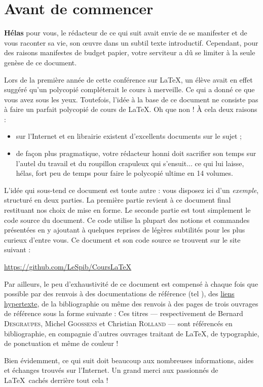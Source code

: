 
\chapter{Avant de commencer}
\mtcaddchapter

{\bf \LARGE Hélas} pour vous, le rédacteur de ce qui suit avait envie de se manifester et de vous raconter \og sa vie, son \oe uvre \fg{} dans un subtil texte introductif. Cependant, pour des raisons manifestes de budget papier, votre serviteur a dû se limiter à la seule genèse de ce document. 

Lors de la première année de cette \og conférence \fg{} sur \LaTeX, un élève avait en effet suggéré qu'un polycopié compléterait le cours à merveille. Ce qui a donné ce que vous avez sous les yeux. Toutefois, l'idée à la base de ce document ne consiste pas à faire un parfait polycopié de cours de \LaTeX. Oh que non ! \`{A} cela deux raisons :

\begin{itemize}
\item sur l'Internet et en librairie existent d'excellents documents sur le sujet ; 
\item de façon plus pragmatique, votre rédacteur honni doit sacrifier son temps sur l'autel du travail et du roupillon crapuleux qui s'ensuit... ce qui lui laisse, hélas, fort peu de temps pour faire le polycopié ultime en 14 volumes. \\
\end{itemize}

L'idée qui sous-tend ce document est toute autre : vous disposez ici d'un \emph{exemple}, structuré en deux parties. La première partie revient à ce document final restituant nos choix de mise en forme. Le seconde partie est tout simplement le code source du document. Ce code utilise la plupart des notions et commandes présentées en y ajoutant à quelques reprises de légères subtilités pour les plus curieux d'entre vous. Ce document et son code source se trouvent sur le site suivant :

\begin{center}
\href{https://github.com/LeSpib/CoursLaTeX}{https://github.com/LeSpib/CoursLaTeX}
\end{center}

Par ailleurs, le peu d'exhaustivité de ce document est compensé à chaque fois que possible par des renvois à des documentations de référence (tel ), des \href{http://fr.wikipedia.org/wiki/Hyperlien}{liens hypertexte}, de la bibliographie ou même des renvois à des pages de trois ouvrages de référence sous la forme suivante :
Ces titres --- respectivement de Bernard \textsc{Desgraupes}\cite{desg}, Michel \textsc{Goossens}\cite{gomi} et Christian \textsc{Rolland}\cite{roll} --- sont référencés en bibliographie, en compagnie d'autres ouvrages traitant de \LaTeX, de typographie, de ponctuation \cite{coli} et même de couleur \cite{past} !

Bien évidemment, ce qui suit doit beaucoup aux nombreuses informations, aides et échanges trouvés sur l'Internet. Un grand merci aux passionnés de \LaTeX\ cachés derrière tout cela !


